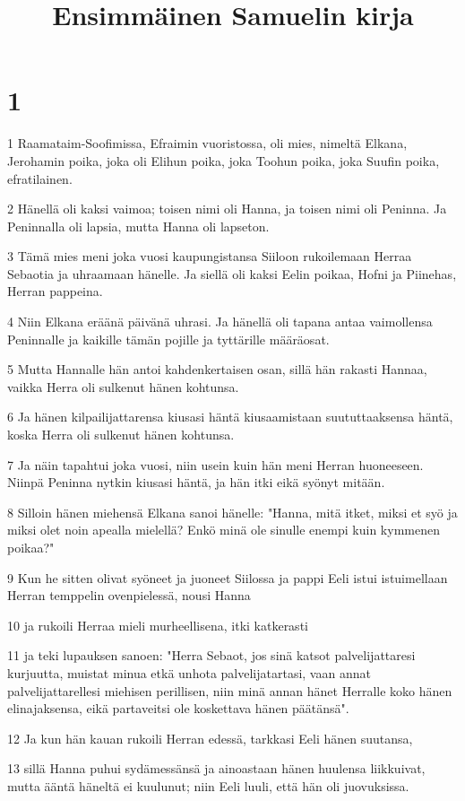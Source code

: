 

\title{Ensimmäinen Samuelin kirja}


\chapter{1}

\par 1 Raamataim-Soofimissa, Efraimin vuoristossa, oli mies, nimeltä Elkana, Jerohamin poika, joka oli Elihun poika, joka Toohun poika, joka Suufin poika, efratilainen.
\par 2 Hänellä oli kaksi vaimoa; toisen nimi oli Hanna, ja toisen nimi oli Peninna. Ja Peninnalla oli lapsia, mutta Hanna oli lapseton.
\par 3 Tämä mies meni joka vuosi kaupungistansa Siiloon rukoilemaan Herraa Sebaotia ja uhraamaan hänelle. Ja siellä oli kaksi Eelin poikaa, Hofni ja Piinehas, Herran pappeina.
\par 4 Niin Elkana eräänä päivänä uhrasi. Ja hänellä oli tapana antaa vaimollensa Peninnalle ja kaikille tämän pojille ja tyttärille määräosat.
\par 5 Mutta Hannalle hän antoi kahdenkertaisen osan, sillä hän rakasti Hannaa, vaikka Herra oli sulkenut hänen kohtunsa.
\par 6 Ja hänen kilpailijattarensa kiusasi häntä kiusaamistaan suututtaaksensa häntä, koska Herra oli sulkenut hänen kohtunsa.
\par 7 Ja näin tapahtui joka vuosi, niin usein kuin hän meni Herran huoneeseen. Niinpä Peninna nytkin kiusasi häntä, ja hän itki eikä syönyt mitään.
\par 8 Silloin hänen miehensä Elkana sanoi hänelle: "Hanna, mitä itket, miksi et syö ja miksi olet noin apealla mielellä? Enkö minä ole sinulle enempi kuin kymmenen poikaa?"
\par 9 Kun he sitten olivat syöneet ja juoneet Siilossa ja pappi Eeli istui istuimellaan Herran temppelin ovenpielessä, nousi Hanna
\par 10 ja rukoili Herraa mieli murheellisena, itki katkerasti
\par 11 ja teki lupauksen sanoen: "Herra Sebaot, jos sinä katsot palvelijattaresi kurjuutta, muistat minua etkä unhota palvelijatartasi, vaan annat palvelijattarellesi miehisen perillisen, niin minä annan hänet Herralle koko hänen elinajaksensa, eikä partaveitsi ole koskettava hänen päätänsä".
\par 12 Ja kun hän kauan rukoili Herran edessä, tarkkasi Eeli hänen suutansa,
\par 13 sillä Hanna puhui sydämessänsä ja ainoastaan hänen huulensa liikkuivat, mutta ääntä häneltä ei kuulunut; niin Eeli luuli, että hän oli juovuksissa.
